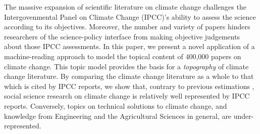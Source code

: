 \documentclass{article}
\begin{document}
	The massive expansion of scientific literature on climate change challenges the Intergovenmental Panel on Climate Change (IPCC)'s ability to assess the science according to its objectives.
	Moreover, the number and variety of papers hinders researchers of the science-policy interface from making objective judgements about those IPCC assessments. In this paper, we present a novel application of a machine-reading approach to model the topical content of 400,000 papers on climate change. This topic model provides the basis for a \textit{topography} of climate change literature. By comparing the climate change literature as a whole to that which is cited by IPCC reports, we show that, contrary to previous estimations \cite{Bjurström2011}, social science research on climate change is relatively well represented by IPCC reports. Conversely, topics on technical solutions to climate change, and knowledge from Engineering and the Agricultural Sciences in general, are under-represented.
\end{document}
